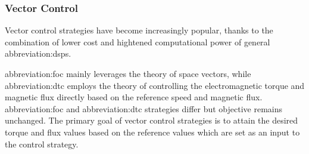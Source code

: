 \documentclass[a4paper, twoside, 11pt]{article}
\begin{document}
        \subsubsection{Vector Control}
            Vector control strategies have become increasingly popular, thanks to the combination of lower cost and hightened computational power of general \gls{abbreviation:dsp}s. \cite{dwivedi-review-on-control-strategies-of-permanent-magnet-assisted-synchronous-reluctance-motor-drive}
            \par
            \gls{abbreviation:foc} mainly leverages the theory of space vectors, while \gls{abbreviation:dtc} employs the theory of controlling the electromagnetic torque and magnetic flux directly based on the reference speed and magnetic flux. \gls{abbreviation:foc} and \gls{abbreviation:dtc} strategies differ but objective remains unchanged. The primary goal of vector control strategies is to attain the desired torque and flux values based on the reference values which are set as an input to the control strategy. \cite{heidari-a-review-of-synchronour-relucatence-motor-drive-advancements, dwivedi-review-on-control-strategies-of-permanent-magnet-assisted-synchronous-reluctance-motor-drive}
            
\end{document}
